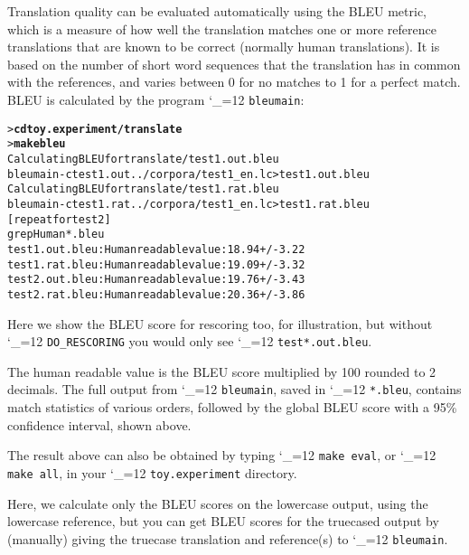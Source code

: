 \documentclass[11pt,letterpaper]{article}
\def\code{\begingroup\catcode`\_=12 \codex}
\newcommand{\codex}[1]{\texttt{#1}\endgroup}
\begin{document}
Translation quality can be evaluated automatically using the BLEU metric, which
is a measure of how well the translation matches one or more reference
translations that are known to be correct (normally human translations). It is
based on the number of short word sequences that the translation has in common
with the references, and varies between 0 for no matches to 1 for a perfect
match. BLEU is calculated by the program \code{bleumain}:
\begin{small}
\begin{alltt}
   > \textbf{cd toy.experiment/translate}
   > \textbf{make bleu}
   Calculating BLEU for translate/test1.out.bleu
   bleumain -c test1.out ../corpora/test1_en.lc > test1.out.bleu
   Calculating BLEU for translate/test1.rat.bleu
   bleumain -c test1.rat ../corpora/test1_en.lc > test1.rat.bleu
   [repeat for test2]
   grep Human *.bleu
   test1.out.bleu:Human readable value: 18.94 +/- 3.22
   test1.rat.bleu:Human readable value: 19.09 +/- 3.32
   test2.out.bleu:Human readable value: 19.76 +/- 3.43
   test2.rat.bleu:Human readable value: 20.36 +/- 3.86
\end{alltt}
\end{small}
Here we show the BLEU score for rescoring too, for illustration, but without
\code{DO_RESCORING} you would only see \code{test*.out.bleu}.

The human readable value is the BLEU score multiplied by 100 rounded to 2
decimals. The full output from \code{bleumain}, saved in \code{*.bleu},
contains match statistics of various orders, followed by the global BLEU score
with a 95\% confidence interval, shown above.

The result above can also be obtained by typing \code{make eval}, or
\code{make all}, in your \code{toy.experiment} directory.

Here, we calculate only the BLEU scores on the lowercase output, using the
lowercase reference, but you can get BLEU scores for the truecased output by
(manually) giving the truecase translation and reference(s) to \code{bleumain}.
\end{document}
